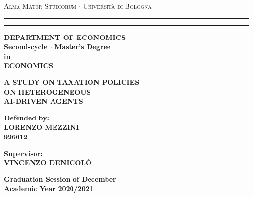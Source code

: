 \begin{titlepage}
    \textwidth=400pt
    \begin{center}
    {{\large{\textsc{Alma Mater Studiorum $\cdot$ Universit\`a di
    Bologna}}}} 
    \rule[0.1cm]{400pt}{0.1mm}
    \rule[0.5cm]{400pt}{0.6mm}
    {\small{\bf DEPARTMENT OF ECONOMICS\\
        Second-cycle $\cdot$ Master's Degree \\ in \\ ECONOMICS }}
    \end{center}
    \vspace{15mm}
    \begin{center}
    {\Large{\bf A STUDY ON TAXATION POLICIES}}\\
    \vspace{3mm}
    {\Large{\bf   ON HETEROGENEOUS }}\\
    \vspace{3mm}
    {\Large{\bf  AI-DRIVEN AGENTS}}\\
    \end{center}
    \vspace{40mm}
    \par
    \noindent
    \begin{minipage}[t]{0.47\textwidth}
    {\large{\bf Defended by:\\
    LORENZO MEZZINI\\
    926012}} 
    \end{minipage}
    \hfill
    \begin{minipage}[t]{0.47\textwidth}\raggedleft
    {\large{\bf Supervisor:\\
    VINCENZO DENICOL\`O}}
    \end{minipage}
    \vspace{20mm}
    \begin{center}
    {\large{\bf Graduation Session of December\\
    Academic Year 2020/2021 }}
    \end{center}
\end{titlepage}
